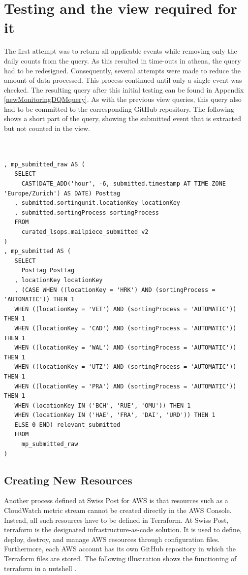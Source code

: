 \section{Testing and the view required for it}

The first attempt was to return all applicable events while removing only the daily counts from the query. As this resulted in time-outs in \gls{athena}, the query had to be redesigned. Consequently, several attempts were made to reduce the amount of data processed. This process continued until only a single event was checked. The resulting query after this initial testing can be found in Appendix \ref{newMonitoringDQMquery}. As with the previous view queries, this query also had to be committed to the corresponding GitHub repository. The following shows a short part of the query, showing the submitted event that is extracted but not counted in the view.

\begin{lstlisting}[style=sqlstyle]


, mp_submitted_raw AS (
   SELECT
     CAST(DATE_ADD('hour', -6, submitted.timestamp AT TIME ZONE 'Europe/Zurich') AS DATE) Posttag
   , submitted.sortingunit.locationKey locationKey
   , submitted.sortingProcess sortingProcess
   FROM
     curated_lsops.mailpiece_submitted_v2
) 
, mp_submitted AS (
   SELECT
     Posttag Posttag
   , locationKey locationKey
   , (CASE WHEN ((locationKey = 'HRK') AND (sortingProcess = 'AUTOMATIC')) THEN 1 
   WHEN ((locationKey = 'VET') AND (sortingProcess = 'AUTOMATIC')) THEN 1 
   WHEN ((locationKey = 'CAD') AND (sortingProcess = 'AUTOMATIC')) THEN 1 
   WHEN ((locationKey = 'WAL') AND (sortingProcess = 'AUTOMATIC')) THEN 1 
   WHEN ((locationKey = 'UTZ') AND (sortingProcess = 'AUTOMATIC')) THEN 1 
   WHEN ((locationKey = 'PRA') AND (sortingProcess = 'AUTOMATIC')) THEN 1 
   WHEN (locationKey IN ('BCH', 'RUE', 'OMU')) THEN 1 
   WHEN (locationKey IN ('HAE', 'FRA', 'DAI', 'URD')) THEN 1 
   ELSE 0 END) relevant_submitted
   FROM
     mp_submitted_raw
) 

\end{lstlisting}





\subsection*{Creating New Resources}

Another process defined at Swiss Post for AWS is that resources such as a CloudWatch metric stream cannot be created directly in the AWS Console. Instead, all such resources have to be defined in Terraform. At Swiss Post, \gls{terraform} is the designated infrastructure-as-code solution. It is used to define, deploy, destroy, and manage AWS resources through configuration files. Furthermore, each AWS account has its own GitHub repository in which the Terraform files are stored. The following illustration shows the functioning of \gls{terraform} in a nutshell \cite{TerraformVisualIntro}.

